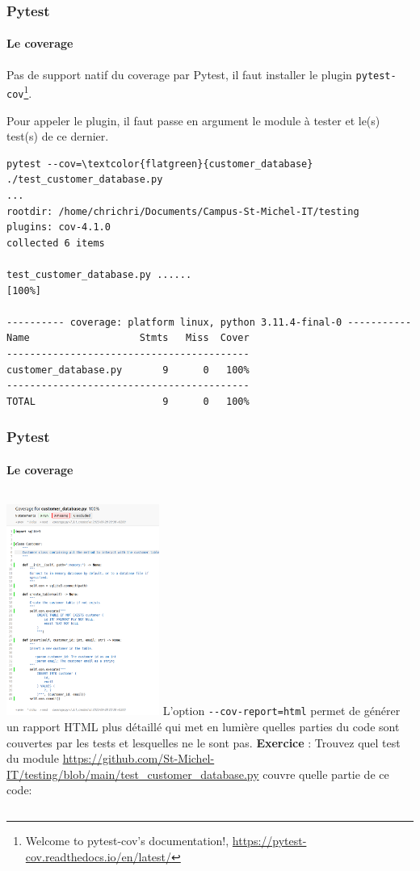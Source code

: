 \documentclass{beamer}
\begin{document}
    \begin{frame}[fragile]
        \frametitle{Pytest}
        \framesubtitle{Le coverage}
        \transdissolve
        Pas de support natif du coverage par Pytest, il faut installer le plugin \lstinline{pytest-cov}\footnote{Welcome to pytest-cov’s documentation!, \url{https://pytest-cov.readthedocs.io/en/latest/}}.

        Pour appeler le plugin, il faut passe en argument le module à tester et le(s) test(s) de ce dernier.


        \begin{lstlisting}
pytest --cov=\textcolor{flatgreen}{customer_database} ./test_customer_database.py
...
rootdir: /home/chrichri/Documents/Campus-St-Michel-IT/testing
plugins: cov-4.1.0
collected 6 items

test_customer_database.py ......                                                                                                                                                                                                 [100%]

---------- coverage: platform linux, python 3.11.4-final-0 -----------
Name                   Stmts   Miss  Cover
------------------------------------------
customer_database.py       9      0   100%
------------------------------------------
TOTAL                      9      0   100%
        \end{lstlisting}

    \end{frame}

    \begin{frame}
        \frametitle{Pytest}
        \framesubtitle{Le coverage}
        \transdissolve
        \begin{columns}

            \centering
            \includegraphics[width=5cm]{image/html-coverage.png}
            L'option \lstinline{--cov-report=html} permet de générer un rapport HTML plus détaillé qui met en lumière quelles parties du code sont couvertes par les tests et lesquelles ne le sont pas.
            \bigbreak
            \textbf{Exercice} : Trouvez quel test du module \url{https://github.com/St-Michel-IT/testing/blob/main/test_customer_database.py} couvre quelle partie de ce code:
        \end{columns}

    \end{frame}
\end{document}
